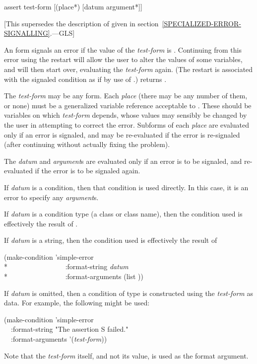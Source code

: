 \begin{defmac}
assert test-form [({place}*) [datum {argument}*]]

   [This supersedes the description of 
   given in section~\ref{SPECIALIZED-ERROR-SIGNALLING}.---GLS]

  An  form signals an error if the value of the \emph{test-form} is .
  Continuing from this
  error using the  restart will allow the user to alter the values
  of some variables, and  will then start over, evaluating the \emph{test-form}
  again.
(The restart is associated with the signaled condition as if by
use of .)
 returns .

  The \emph{test-form} may be any form. Each \emph{place} (there may be any number of them, 
  or none) must be a generalized variable reference acceptable to .
  These should be variables on which \emph{test-form} depends, whose values
  may sensibly be changed by the user in attempting to correct the error.
  Subforms of each \emph{place} are evaluated only if an error is signaled, and
  may be re-evaluated if the error is re-signaled (after continuing without
  actually fixing the problem).

  The \emph{datum} and \emph{argument\/}s are evaluated only if an error is to be
  signaled, and re-evaluated if the error is to be signaled again.

  If \emph{datum} is a condition, then that condition is used directly. 
  In this case, it is an error to specify any \emph{argument\/}s.

  If \emph{datum} is a condition type (a class or class name), then the condition used is effectively the result
  of .

  If \emph{datum} is a string, then the condition used is effectively the result of
\begin{lisp}
(make-condition 'simple-error \\*
~~~~~~~~~~~~~~~~:format-string \emph{datum} \\*
~~~~~~~~~~~~~~~~:format-arguments (list ))
\end{lisp}

  If \emph{datum} is omitted, then a condition of type  is 
  constructed using the \emph{test-form} as data. For example, the following
  might be used:
\begin{lisp}
(make-condition 'simple-error \\
~~:format-string "The assertion {\Xtilde}S failed." \\
~~:format-arguments '(\emph{test-form}))
\end{lisp}
Note that the \emph{test-form} itself, and not its value, is used as the format argument.


\end{defmac}
